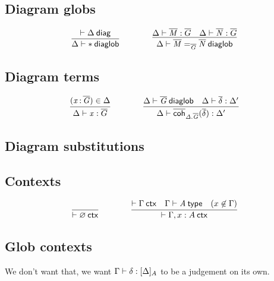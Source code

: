 \subsection{Diagram globs}

\begin{small}
  \[
  \infer{\wfdiaglob{\Delta}{\diagbase}}
  {\wfdiag{\Delta}}
  \qquad\qquad
  \infer{\wfdiaglob{\Delta}{\homj{\diag G}{\diag M}{\diag N}}}
  {\ofdiaglob{\Delta}{\diag M}{\diag G}
    & \ofdiaglob{\Delta}{\diag N}{\diag G}}
  \]
\end{small}

\subsection{Diagram terms}

\begin{small}
  \[
  \infer{\ofdiaglob{\Delta}{x}{\diag G}}
  {(\tptm{x}{\diag G})\in\Delta}
  \qquad\qquad
  \infer{\ofdiaglob{\Delta}{\diagcoh{\Delta.\diag G}{\diag\delta}}{\Delta'}}
  {\wfdiaglob{\Delta}{\diag G}
    & \substdiaglob{\Delta}{\diag\delta}{\Delta'}}
  \]
\end{small}

\subsection{Diagram substitutions}



\subsection{Contexts}

\begin{small}
  \[
  \infer{\wfctx{\varnothing}}{}
  \qquad\qquad
  \infer{\wfctx{\Gamma,x:A}}
  {\wfctx{\Gamma}
    & \wftype{\Gamma}{A}
    & (x\not\in\Gamma)}
  \]
\end{small}

\subsection{Glob contexts}

We don’t want that, we want $\text{\ensuremath{\Gamma}} \vdash \mathit{\delta} : {[\Delta]_A}$ to be a
judgement on its own.

